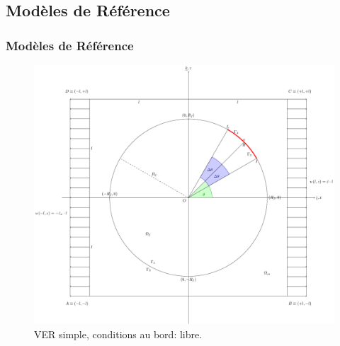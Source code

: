 \documentclass[first,firstsupp,lastsupp,handout,last,hyperref,table]{ETHclass}
\begin{document}
\subsection{Mod\`eles de R\'ef\'erence}

\begin{frame}
\frametitle{Mod\`eles de R\'ef\'erence}
\vspace{-0.25cm}
\centering
\begin{figure}
\centering
\includegraphics[height=0.7\textheight]{LEFM2DsRVEsFsDfreeBCULappAxialDispLR.pdf}
\caption{\scriptsize VER simple, conditions au bord: libre.}
\label{fig:singleRVE-rigid}
\end{figure}
\end{frame}
\end{document}
